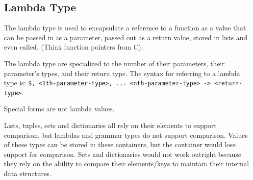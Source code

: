 
\subsection{Lambda Type}
{
	The lambda type is used to encapsulate a reference to
	a function as a value that can be passed in as a parameter, passed out as a
	return value, stored in lists and even called. (Think function pointers from C).
	
	The lambda type are specialized to the number of their
	parameters, their parameter's types, and their return type.
	The syntax for referring to a lambda type
	is: \texttt{\$<0th-parameter-type>, <1th-parameter-type>, ... <nth-parameter-type> -> <return-type>}.
	
	Special forms are not lambda values.
	
	Lists, tuples, sets and dictionaries all rely on their elements
	to support comparison, but lambdas and grammar types do not support
	comparison. Values of these types can be stored in these containers,
	but the container would lose support for comparison. Sets and
	dictionaries would not work outright because they rely on the ability
	to compare their elements/keys to maintain their internal data structures.
}
